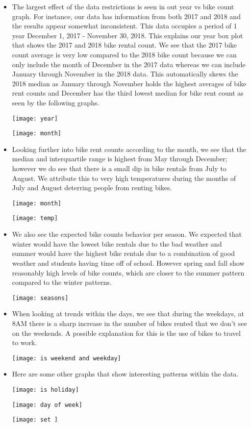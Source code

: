 \documentclass[main.tex]{subfiles}
\begin{document}
\begin{itemize}
    \item The largest effect of the data restrictions is seen in out year vs bike count graph. For instance, our data has information from both 2017 and 2018 and the results appear somewhat inconsistent. This data occupies a period of 1 year December 1, 2017 - November 30, 2018. This explains our year box plot that shows the 2017 and 2018 bike rental count. We see that the 2017 bike count average is very low compared to the 2018 bike count because we can only include the month of December in the 2017 data whereas we can include January through November in the 2018 data. This automatically skews the 2018 median as January through November holds the highest averages of bike rent counts and December has the third lowest median for bike rent count as seen by the following graphs.
    
    \texttt{[image: year]}
    
    \texttt{[image: month]}
    
    \item Looking further into bike rent counts according to the month, we see that the median and interquartile range is highest from May through December; however we do see that there is a small dip in bike rentals from July to August. We attribute this to very high temperatures during the months of July and August deterring people from renting bikes.
    
    \texttt{[image: month]}
    
    \texttt{[image: temp]}
    
    \item We also see the expected bike counts behavior per season. We expected that winter would have the lowest bike rentals due to the bad weather and summer would have the highest bike rentals due to a combination of good weather and students having time off of school. However spring and fall show reasonably high levels of bike counts, which are closer to the summer pattern compared to the winter patterns. 
    
    \texttt{[image: seasons]}
    
    \item When looking at trends within the days, we see that during the weekdays, at 8AM there is a sharp increase in the number of bikes rented that we don’t see on the weekends. A possible explanation for this is the use of bikes to travel to work. 
    
    \texttt{[image: is weekend and weekday]}
    
    \item Here are some other graphs that show interesting patterns within the data. 
    
    \texttt{[image: is holiday]}
    
    \texttt{[image: day of week]}
    
    \texttt{[image: set ]}

    
\end{itemize}
\end{document}
